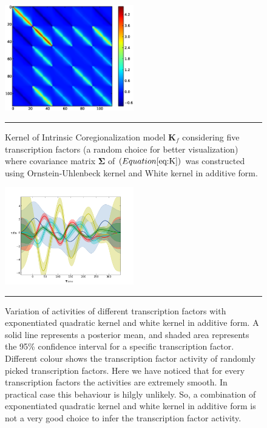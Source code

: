 \begin{figure}[!htbp]
	\centering
	\includegraphics[width=0.5\textwidth,keepaspectratio]{diagrams/kern_6TF.eps}
	\rule{25em}{0.5pt}
	\caption[Kernel of intrinsic coregionalization model $\textbf{K}_f$ considering 5 transcription factors where covariance matrix $\boldsymbol{\Sigma}$ was constructed using Ornstein-Uhlenbeck kernel and White kernel in additive form] {Kernel of Intrinsic Coregionalization model $\textbf{K}_f$ considering five transcription factors (a random choice for better visualization) where covariance matrix $\boldsymbol{\Sigma}$ of $\left( Equation \ref{eq:K} \right)$ was constructed using Ornstein-Uhlenbeck kernel and White kernel in additive form.}
	\label{fig:kern_6TF}
\end{figure}
\begin{figure}[!htbp]
	\centering
	\includegraphics[width=0.5\textwidth,keepaspectratio]{diagrams/RBFWh9TF.png}
	\rule{25em}{0.5pt}
	\caption[Variation of activities of transcription factors with exponentiated quadratic kernel and white kernel in additive form] {Variation of activities of different transcription factors with exponentiated quadratic kernel and white kernel in additive form. A solid line represents a posterior mean, and shaded area represents the 95\% confidence interval for a specific transcription factor. Different colour shows the transcription factor activity of randomly picked transcription factors. Here we have noticed that for every transcription factors the activities are extremely smooth. In practical case this behaviour is hilgly unlikely. So, a combination of exponentiated quadratic kernel and white kernel in additive form is not a very good choice to infer the transcription factor activity.}
	\label{fig:TFA_with_RBFnWhKernel}
\end{figure}

